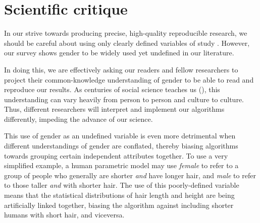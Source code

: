 \documentclass[sigconf,review,balance=false]{acmart}
\begin{document}

\section{Scientific critique}


In our strive towards producing precise, high-quality reproducible research, we
should be careful about using  only clearly defined variables of study . However,
our survey shows gender to be widely used yet undefined in our literature.

In doing this, we are effectively asking our readers and fellow researchers to
project their common-knowledge understanding of gender to be able to read and
reproduce our results. As centuries of social science teaches us
(), this understanding can vary heavily from person
to person and culture to culture. Thus, different researchers will interpret and
implement our algorithms differently, impeding the advance of our science. 

This use of gender as an undefined variable is even more detrimental when
different understandings of gender are conflated, thereby biasing algorithms
towards grouping certain independent attributes together. To use a very
simplified example, a human parametric model may use \emph{female} to refer to a
group of people who generally are shorter \emph{and} have longer hair, and
\emph{male} to refer to those taller \emph{and} with shorter hair. The use of
this poorly-defined variable means that the statistical distributions of hair
length and height are being artificially linked together, biasing the algorithm
against including shorter humans with short hair, and viceversa. 
\end{document}
